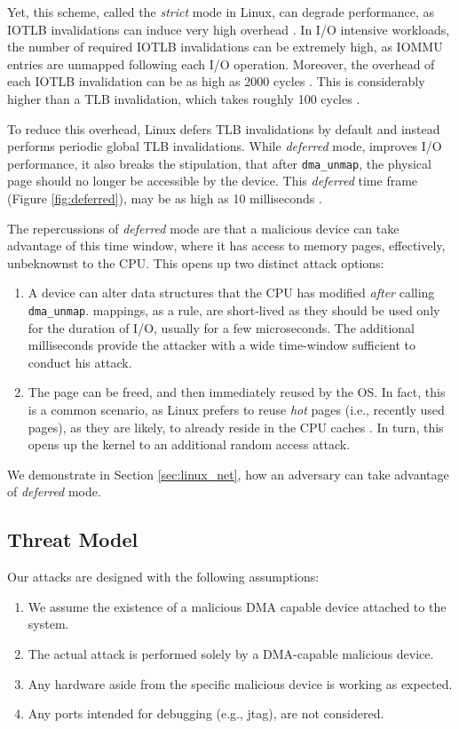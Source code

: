 Yet, this scheme, called the \emph{strict} mode in Linux, can degrade performance, as IOTLB invalidations can induce very high overhead \cite{MMT16,MSMT18,Peleg15}. In I/O intensive workloads, the number of required IOTLB invalidations can be extremely high, as IOMMU entries are unmapped following each I/O operation. Moreover, the overhead of each IOTLB invalidation can be as high as 2000 cycles \cite{ABYTS11}. This is considerably higher than a TLB invalidation, which takes roughly 100 cycles \cite{Han14}. 

To reduce this overhead, Linux defers TLB invalidations by default and instead performs periodic global TLB invalidations. While \emph{deferred} mode, improves I/O performance, it also breaks the stipulation, that after \texttt{dma\_unmap}, the physical page should no longer be accessible by the device. This \emph{deferred} time frame (Figure \ref{fig:deferred}), may be as high as 10 milliseconds \cite{MSMT18}.

The repercussions of \emph{deferred} mode are that a malicious device can take advantage of this time window, where it has access to memory pages, effectively, unbeknownst to the CPU. This opens up two distinct attack options:

\begin{enumerate}
    \item A device can alter data structures that the CPU has modified \emph{after} calling \texttt{dma\_unmap}.
    \iova{} mappings, as a rule, are short-lived as they should be used only for the duration of I/O, usually for a few microseconds. The additional milliseconds provide the attacker with a wide time-window sufficient to conduct his attack.
    \item The page can be freed, and then immediately reused by the OS. In fact, this is a common scenario, as Linux prefers to reuse \emph{hot} pages (i.e., recently used pages), as they are likely, to already reside in the CPU caches \cite{hotcold}. In turn, this opens up the kernel to an additional random access attack.
\end{enumerate}

We demonstrate in Section \ref{sec:linux_net}, how an adversary can take advantage of \emph{deferred} mode.

\subsection{Threat Model}

Our attacks are designed with the following assumptions:
\begin{enumerate}
    \item We assume the existence of a malicious DMA capable device attached to the system.
    \item The actual attack is performed solely by a DMA-capable malicious device.
    \item Any hardware aside from the specific malicious device is working as expected.
    \item Any ports intended for debugging (e.g., jtag), are not considered.
 \end{enumerate}

